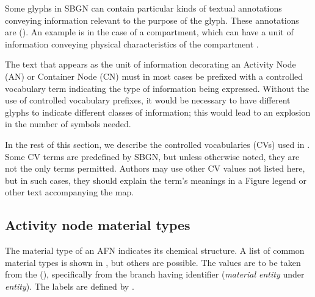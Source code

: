 
\normalcolor

Some glyphs in SBGN \AF can contain particular kinds of textual annotations conveying information relevant to the purpose of the glyph.  These annotations are  ().  An example is in the case of a compartment, which can have a unit of information conveying physical characteristics of the compartment .

The text that appears as the unit of information decorating an Activity Node (AN) or Container Node (CN) must in most cases be prefixed with a controlled vocabulary term indicating the type of information being expressed. Without the use of controlled vocabulary prefixes, it would be necessary to have different glyphs to indicate different classes of information; this would lead to an explosion in the number of symbols needed. 

In the rest of this section, we describe the controlled vocabularies (CVs) used in \SBGNAFLone. Some CV terms are predefined by SBGN, but unless otherwise noted, they are not the only terms permitted. Authors may use other CV values not listed here, but in such cases, they should explain the term's meanings in a Figure legend or other text accompanying the map.

\subsection{Activity node material types}
\label{sec:af:material-types-cv}

The material type of an AFN indicates its chemical structure.  A list of common material types is shown in , but others are possible.  The values are to be taken from the \sbo (\sbourl), specifically from the branch having identifier  ($\!$\emph{material entity} under \emph{entity}).  The labels are defined by \SBGNAFLone.

